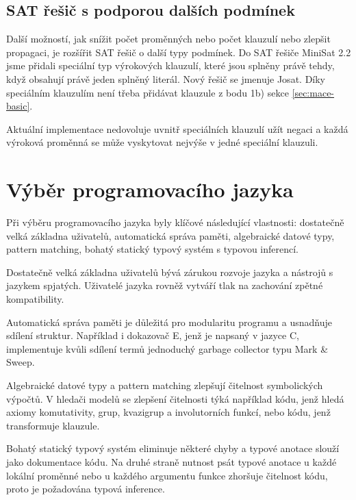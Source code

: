 
\subsection{SAT řešič s podporou dalších podmínek}

Další možností, jak snížit počet proměnných nebo počet klauzulí
nebo zlepšit propagaci, je rozšířit SAT řešič o další typy podmínek.
Do SAT řešiče MiniSat 2.2 \cite{minisat} jsme přidali speciální
typ výrokových klauzulí, které jsou splněny právě tehdy,
když obsahují právě jeden splněný literál.
Nový řešič se jmenuje Josat.
Díky speciálním klauzulím není třeba přidávat klauzule
z bodu 1b) sekce \ref{sec:mace-basic}.

Aktuální implementace nedovoluje uvnitř speciálních klauzulí užít negaci
a každá výroková proměnná se může vyskytovat nejvýše v jedné
speciální klauzuli.

\section{Výběr programovacího jazyka}

Při výběru programovacího jazyka byly klíčové následující vlastnosti:
dostatečně velká základna uživatelů,
automatická správa paměti,
algebraické datové typy, pattern matching,
bohatý statický typový systém s typovou inferencí.

Dostatečně velká základna uživatelů bývá zárukou
rozvoje jazyka a nástrojů s jazykem spjatých.
Uživatelé jazyka rovněž vytváří tlak
na zachování zpětné kompatibility.

Automatická správa paměti je důležitá pro modularitu
programu a usnadňuje sdílení struktur.
Například i dokazovač E, jenž je napsaný v jazyce C,
implementuje kvůli sdílení termů
jednoduchý garbage collector typu Mark \& Sweep.

Algebraické datové typy a pattern matching
zlepšují čitelnost symbolických výpočtů.
V hledači modelů \crossbow{}
se zlepšení čitelnosti týká například kódu, jenž
hledá axiomy komutativity, grup, kvazigrup a involutorních funkcí,
nebo kódu, jenž transformuje klauzule.

Bohatý statický typový systém eliminuje některé chyby
a typové anotace slouží jako dokumentace kódu.
Na druhé straně nutnost psát typové anotace
u každé lokální proměnné nebo u každého argumentu funkce
zhoršuje čitelnost kódu, proto je požadována typová inference.

